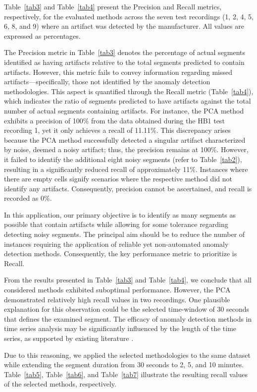 \documentclass[conference]{IEEEtran}
\begin{document}
Table~\ref{tab3} and Table~\ref{tab4} present the Precision and Recall metrics, respectively, for the evaluated methods across the seven test recordings (1, 2, 4, 5, 6, 8, and 9) where an artifact was detected by the manufacturer. All values are expressed as percentages.

The Precision metric in Table~\ref{tab3} denotes the percentage of actual segments identified as having artifacts relative to the total segments predicted to contain artifacts. However, this metric fails to convey information regarding missed artifacts—specifically, those not identified by the anomaly detection methodologies. This aspect is quantified through the Recall metric (Table~\ref{tab4}), which indicates the ratio of segments predicted to have artifacts against the total number of actual segments containing artifacts. For instance, the PCA method exhibits a precision of 100\% from the data obtained during the HB1 test recording 1, yet it only achieves a recall of 11.11\%. This discrepancy arises because the PCA method successfully detected a singular artifact characterized by noise, deemed a noisy artifact; thus, the precision remains at 100\%. However, it failed to identify the additional eight noisy segments (refer to Table~\ref{tab2}), resulting in a significantly reduced recall of approximately 11\%. Instances where there are empty cells signify scenarios where the respective method did not identify any artifacts. Consequently, precision cannot be ascertained, and recall is recorded as 0\%.

In this application, our primary objective is to identify as many segments as possible that contain artifacts while allowing for some tolerance regarding detecting noisy segments. The principal aim should be to reduce the number of instances requiring the application of reliable yet non-automated anomaly detection methods. Consequently, the key performance metric to prioritize is Recall.

From the results presented in Table~\ref{tab3} and Table~\ref{tab4}, we conclude that all considered methods exhibited suboptimal performance. However, the PCA demonstrated relatively high recall values in two recordings. One plausible explanation for this observation could be the selected time-window of 30 seconds that defines the examined segment. The efficacy of anomaly detection methods in time series analysis may be significantly influenced by the length of the time series, as supported by existing literature \cite{Lee_2021}.

Due to this reasoning, we applied the selected methodologies to the same dataset while extending the segment duration from 30 seconds to 2, 5, and 10 minutes. Table~\ref{tab5}, Table~\ref{tab6}, and Table~\ref{tab7} illustrate the resulting recall values of the selected methods, respectively. 
\end{document}
